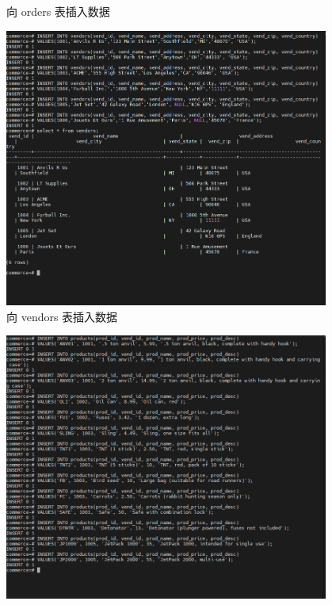 \begin{enumerate}
\begin{figure}[H]
\begin{center}
  \end{center}
  \caption{向 orders 表插入数据}
\end{figure}
\begin{figure}[H]
  \begin{center}
    \includegraphics[width=0.95\textwidth,scale=0.5]{./figures/insert_table_vendors.png}
  \end{center}
  \caption{向 vendors 表插入数据}
\end{figure}
\begin{figure}[H]
  \begin{center}
    \includegraphics[width=0.95\textwidth,scale=0.5]{./figures/insert_table_products.png}

\end{center}
\end{figure}
\end{enumerate}
